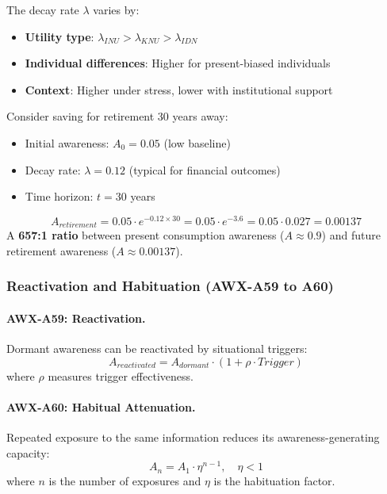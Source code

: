 The decay rate $\lambda$ varies by:
\begin{itemize}
    \item \textbf{Utility type}: $\lambda_{INU} > \lambda_{KNU} > \lambda_{IDN}$
    \item \textbf{Individual differences}: Higher for present-biased individuals
    \item \textbf{Context}: Higher under stress, lower with institutional support
\end{itemize}

\begin{example}
Consider saving for retirement 30 years away:
\begin{itemize}
    \item Initial awareness: $A_0 = 0.05$ (low baseline)
    \item Decay rate: $\lambda = 0.12$ (typical for financial outcomes)
    \item Time horizon: $t = 30$ years
\end{itemize}
\[
A_{retirement} = 0.05 \cdot e^{-0.12 \times 30} = 0.05 \cdot e^{-3.6} = 0.05 \cdot 0.027 = 0.00137
\]
A \textbf{657:1 ratio} between present consumption awareness ($A \approx 0.9$) 
and future retirement awareness ($A \approx 0.00137$).
\end{example}

\subsubsection{Reactivation and Habituation (AWX-A59 to A60)}

\paragraph{AWX-A59: Reactivation.}
Dormant awareness can be reactivated by situational triggers:
\begin{equation}
A_{reactivated} = A_{dormant} \cdot (1 + \rho \cdot Trigger)
\end{equation}
where $\rho$ measures trigger effectiveness.

\paragraph{AWX-A60: Habitual Attenuation.}
Repeated exposure to the same information reduces its awareness-generating 
capacity:
\begin{equation}
A_{n} = A_1 \cdot \eta^{n-1}, \quad \eta < 1
\end{equation}
where $n$ is the number of exposures and $\eta$ is the habituation factor.


